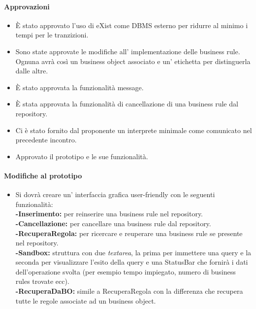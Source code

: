 \documentclass[11pt,titlepage,a4paper]{report}
\begin{document}
\paragraph{Approvazioni}
\begin{itemize}
\item \`E stato approvato l'uso di eXist come DBMS esterno per ridurre al minimo i tempi per le tranzizioni.
\item Sono state approvate le modifiche all' implementazione delle business rule. Ognuna avr\`a cos\`i un business object associato e un' etichetta per distinguerla dalle altre.
\item \`E stato approvata la funzionalit\`a message.
\item \`E stata approvata la funzionalit\`a di cancellazione di una business rule dal repository.
\item Ci \`e stato fornito dal proponente un interprete minimale come comunicato nel precedente incontro.
\item Approvato il prototipo e le sue funzionalit\`a.
\end{itemize}

\paragraph{Modifiche al prototipo}
\begin{itemize}
\item Si dovr\`a creare un' interfaccia grafica user-friendly con le seguenti funzionalit\`a:\\
\textbf{-Inserimento:} per reinserire una business rule nel repository.\\
\textbf{-Cancellazione:} per cancellare una business rule dal repository.\\
\textbf{-RecuperaRegola:} per ricercare e reuperare una business rule se presente nel repository.\\
\textbf{-Sandbox: }struttura con due \textit{textarea}, la prima per immettere una query e la seconda per visualizzare l'esito della query e una StatusBar che fornir\`a i dati dell'operazione svolta (per esempio tempo impiegato, numero di business rules trovate ecc).\\
\textbf{-RecuperaDaBO: }simile a RecuperaRegola con la differenza che recupera tutte le regole associate ad un business object.\\
\end{itemize}
\end{document}

